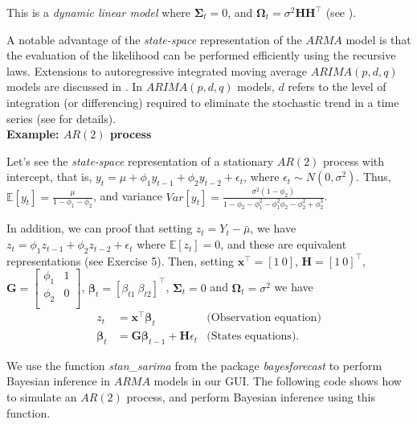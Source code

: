 This is a \textit{dynamic linear model} where $\bm{\Sigma}_t=0$, and $\bm{\Omega}_t=\sigma^2\bm{H}\bm{H}^{\top}$ (see \cite{petris2009dynamic,chib1994bayes}).

A notable advantage of the \textit{state-space} representation of the $ARMA$ model is that the evaluation of the likelihood can be performed efficiently using the recursive laws. Extensions to autoregressive integrated moving average $ARIMA(p,d,q)$ models are discussed in \cite[Chap.~3]{petris2009dynamic}. In $ARIMA(p,d,q)$ models, $d$ refers to the level of integration (or differencing) required to eliminate the stochastic trend in a time series (see \cite[Chap.~4]{enders_2014} for details).\\

\textbf{Example: $AR(2)$ process}

Let's see the \textit{state-space} representation of a stationary $AR(2)$ process with intercept, that is, $y_t=\mu+\phi_1y_{t-1}+\phi_2y_{t-2}+\epsilon_t$, where $\epsilon_t\sim N(0,\sigma^2)$. Thus, $\mathbb{E}[y_t]=\frac{\mu}{1-\phi_1-\phi_2}$, and variance $Var[y_t]=\frac{\sigma^2(1-\phi_2)}{1-\phi_2-\phi_1^2-\phi_1^2\phi_2-\phi_2^2+\phi_2^3}$.

In addition, we can proof that setting $z_t=Y_t-\bar{\mu}$, we have $z_t=\phi_1z_{t-1}+\phi_2z_{t-2}+\epsilon_t$ where $\mathbb{E}[z_t]=0$, and these are equivalent representations (see Exercise 5). Then, setting  $\bm{x}^{\top}=[1 \ 0]$, $\bm{H}=[1 \ 0]^{\top}$, $\bm{G}=\begin{bmatrix}
	\phi_1 & 1\\
	\phi_2 & 0 \\
\end{bmatrix}$, $\bm{\beta}_t=[\beta_{t1} \ \beta_{t2}]^{\top}$, $\bm{\Sigma}_t=0$ and $\bm{\Omega}_t=\sigma^2$ we have
\begin{align*}
	z_t&=\bm{x}^{\top}\bm{\beta}_t& \text{(Observation equation)}\\
	\bm{\beta}_t&=\bm{G}\bm{\beta}_{t-1}+\bm{H}{\epsilon}_t & \text{(States equations)}.
\end{align*}

We use the function \textit{stan\_sarima} from the package \textit{bayesforecast} to perform Bayesian inference in $ARMA$ models in our GUI. The following code shows how to simulate an $AR(2)$ process, and perform Bayesian inference using this function.


